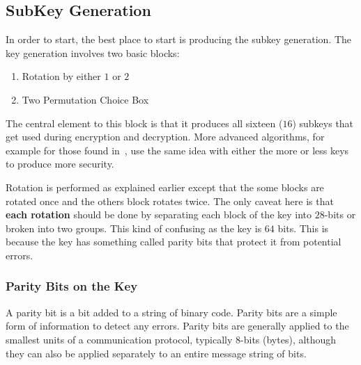 \documentclass{article}
\begin{document}
\subsection{SubKey Generation}

In order to start, the best place to start is producing the subkey
generation.  The key generation involves two basic blocks:
\begin{enumerate}
\item Rotation by either $1$ or $2$
\item Two Permutation Choice Box 
\end{enumerate}
The central element to this block is that it produces all sixteen
($16$) subkeys that get used during
encryption and decryption.  More advanced algorithms, for example for
those found in~\cite{10.5555/1721909}, use the same idea with either
the more or less keys to produce more security.

Rotation is performed as explained earlier except that the some blocks are
rotated once and the others block rotates twice.  The only caveat here
is that \textbf{each rotation} should be done by separating each
block of the key
into $28$-bits or broken into two groups.  This kind of confusing as
the key is $64$ bits.  This is because the key has something called
parity bits that protect it from potential errors.

\subsubsection{Parity Bits on the Key}

A parity bit is a bit added to a string of binary code. Parity bits
are a simple form of information to detect any errors.  Parity bits
are generally
applied to the smallest units of a communication protocol, typically
$8$-bits (bytes), although they can also be applied separately to
an entire message string of bits.
\end{document}
